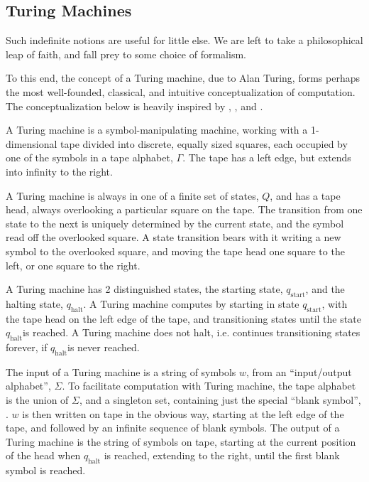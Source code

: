 \subsection{Turing Machines}

Such indefinite notions are useful for little else. We are left to take a
philosophical leap of faith, and fall prey to some choice of formalism.

To this end, the concept of a Turing machine, due to Alan
Turing\cite{turing-1936-7}, forms perhaps the most well-founded, classical, and
intuitive conceptualization of computation. The conceptualization below is
heavily inspired by \cite{jones-1997}, \cite{homer-selman-2011}, and
\cite{sipser-2013}.

A Turing machine is a symbol-manipulating machine, working with a 1-dimensional
tape divided into discrete, equally sized squares, each occupied by one of the
symbols in a tape alphabet, $\Gamma$. The tape has a left edge, but extends
into infinity to the right.

A Turing machine is always in one of a finite set of states, $Q$, and has a
tape head, always overlooking a particular square on the tape. The transition
from one state to the next is uniquely determined by the current state, and the
symbol read off the overlooked square. A state transition bears with it writing
a new symbol to the overlooked square, and moving the tape head one square to
the left, or one square to the right.

\def\qstart{\ensuremath{q_{\text{start}}}}
\def\qhalt{\ensuremath{q_{\text{halt}}}}

A Turing machine has 2 distinguished states, the starting state, \qstart, and
the halting state, \qhalt. A Turing machine computes by starting in state
\qstart, with the tape head on the left edge of the tape, and transitioning
states until the state \qhalt is reached. A Turing machine does not halt, i.e.
continues transitioning states forever, if \qhalt is never reached.

The input of a Turing machine is a string of symbols $w$, from an
``input/output alphabet'', $\Sigma$. To facilitate computation with Turing
machine, the tape alphabet is the union of $\Sigma$, and a singleton set,
containing just the special ``blank symbol'', \textvisiblespace. $w$ is then
written on tape in the obvious way, starting at the left edge of the tape, and
followed by an infinite sequence of blank symbols.  The output of a Turing
machine is the string of symbols on tape, starting at the current position of
the head when $\qhalt$ is reached, extending to the right, until the first
blank symbol is reached.

